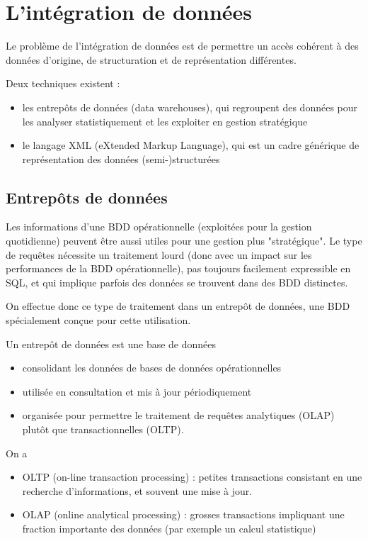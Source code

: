 \chapter{L'intégration de données}

Le problème de l'intégration de données est de permettre un accès cohérent à des données d'origine, de structuration et de représentation différentes.

Deux techniques existent :

\begin{itemize}
	\item les entrepôts de données (data warehouses), qui regroupent des données pour les analyser statistiquement et les exploiter en gestion stratégique
	\item le langage XML (eXtended Markup Language), qui est un cadre générique de représentation des données (semi-)structurées
\end{itemize}

	\section{Entrepôts de données}
	
	Les informations d'une BDD opérationnelle (exploitées pour la gestion quotidienne) peuvent être aussi utiles pour une gestion plus "stratégique". Le type de requêtes nécessite un traitement lourd (donc avec un impact sur les performances de la BDD opérationnelle), pas toujours facilement expressible en SQL, et qui implique parfois des données se trouvent dans des BDD distinctes.
	
	On effectue donc ce type de traitement dans un entrepôt de données,  une BDD spécialement conçue pour cette utilisation.
	
	Un entrepôt de données est une base de données
	
	\begin{itemize}
		\item consolidant les données de bases de données opérationnelles
		\item utilisée en consultation et mis à jour périodiquement
		\item organisée pour permettre le traitement de requêtes analytiques (OLAP) plutôt que transactionnelles (OLTP).
	\end{itemize}
	
	On a
	
	\begin{itemize}
		\item OLTP (on-line transaction processing) : petites transactions consistant en une recherche d'informations, et souvent une mise à jour.
		\item OLAP (online analytical processing) : grosses transactions impliquant une fraction importante des données (par exemple un calcul statistique)
	\end{itemize}
	
